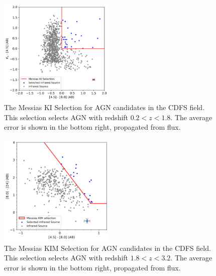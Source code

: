 \documentclass[12pt]{iopart}
\begin{document}
\begin{figure}[h]
  \centering
  \includegraphics[width=0.49\textwidth]{plots/CDFSMessiasKISelection_error.png}
  \caption{The Messias KI Selection for AGN candidates in the CDFS field. This selection selects AGN with redshift $0.2 < z < 1.8$. The average error is shown in the bottom right, propagated from flux.}
  \label{fig:MessiasKI}
\end{figure}
\begin{figure}[h]
  \centering
  \includegraphics[width=0.49\textwidth]{plots/CDFSMessiasKIMSelection_error.png}
  \caption{The Messias KIM Selection for AGN candidates in the CDFS field. This selection selects AGN with redshift $1.8 < z < 3.2$. The average error is shown in the bottom right, propagated from flux.}
  \label{fig:Messias}
\end{figure}
\end{document}
